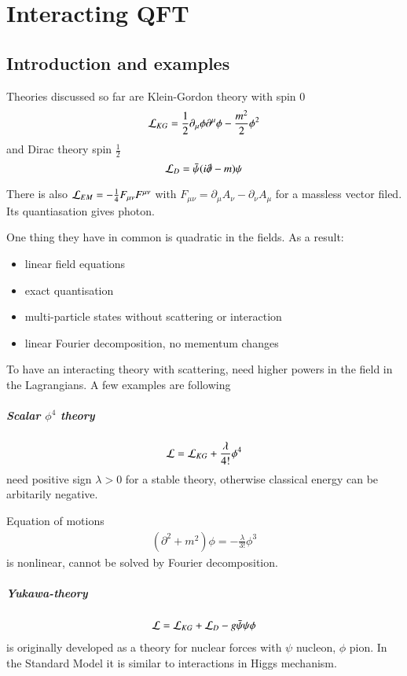 \chapter{Interacting QFT}
\setcounter{chapter}{4}
\section{Introduction and examples}
Theories discussed so far are Klein-Gordon theory with spin $0$ 
$$\mathcal{L}_{KG} = \frac{1}{2}\partial_\mu\phi\partial^\mu\phi - \frac{m^2}{2}\phi^2$$ 
and Dirac theory spin $\frac{1}{2}$ 
$$\mathcal{L}_D = \bar{\psi}(i\slashed{\partial} - m) \psi $$

There is also $\mathcal{L}_{EM} = -\frac{1}{4}F_{\mu\nu}F^{\mu\nu}$ with $F_{\mu\nu} = \partial_\mu A_\nu - \partial_\nu A_\mu$ for a massless vector filed. Its quantiasation gives photon.

One thing they have in common is quadratic in the fields. As a result:
\begin{itemize}
	\item linear field equations
	\item exact quantisation
	\item multi-particle states without scattering or interaction
	\item linear Fourier decomposition, no mementum changes
\end{itemize}

To have an interacting theory with scattering, need higher powers in the field in the Lagrangians. A few examples are following
\paragraph{Scalar $\phi^4$ theory}
\begin{align*}
	\mathcal{L} = \mathcal{L}_{KG} + \frac{\lambda}{4!} \phi^4
\end{align*}
need positive sign $\lambda > 0$ for a stable theory, otherwise classical energy can be arbitarily negative.

Equation of motions
\begin{align*}
	(\partial^2+ m ^2) \phi = -\frac{\lambda}{3!} \phi^3
\end{align*}
is nonlinear, cannot be solved by Fourier decomposition.

\paragraph{Yukawa-theory}
\begin{align*}
	\mathcal{L} = \mathcal{L}_{KG} + \mathcal{L}_{D} - g \bar{\psi}\psi \phi
\end{align*}
is originally developed as a theory for nuclear forces with $\psi$ nucleon, $\phi$ pion. In the Standard Model it is similar to interactions in Higgs mechanism.

